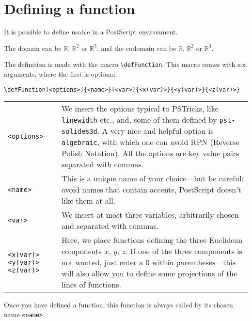 \section{Defining a function}

It is possible to define  usable in a PostScript environment.

The domain can be  $\mathbb{R}$, $\mathbb{R}^2$
or $\mathbb{R}^3$, and the codomain can be $\mathbb{R}$, $\mathbb{R}^2$ or $\mathbb{R}^3$.

The definition is made with the macro \verb+\defFunction+. This macro comes with six
arguments, where the first is optional.


\verb!\defFunction[<options>]{<name>}(<var>){<x(var)>}{<y(var)>}{<z(var)>}!

\begin{table}[h]
\begin{tabular}{p{2cm}p{11cm}}
\verb!<options>! & We insert the options typical to PSTricks, like
\verb!linewidth! etc., and, some of them defined by
\verb!pst-solides3d!. A very nice and helpful option is \verb!algebraic!,
with which one can avoid  RPN (Reverse Polish
Notation). All the options are key value pairs separated with commas.\\

\verb!<name>! & This is a unique name of your choice---but be careful: avoid
names that contain accents, PostScript doesn't like them at all.\\

\verb!<var>! & We insert at most three variables, arbitrarily chosen and separated with commas.\\

\verb!<x(var)>! \verb!<y(var)>! \verb!<z(var)>! &
Here, we place functions defining the three Euclidean components $x,\,y,\,z$.
If one of the three components is not wanted, just enter a 0 within
 parentheses---this will also allow you to define some projections of the lines of functions.
\end{tabular}
\end{table}

Once you have defined a function, this function is always called by its chosen name \verb!<name>!.

